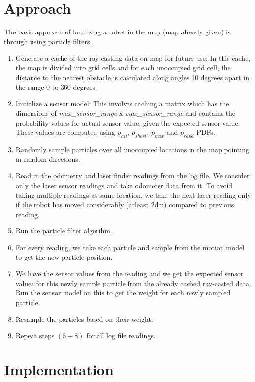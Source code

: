 \documentclass{article}
\begin{document}
\section{Approach}
The basic approach of localizing a robot in the map (map already given) is through using particle filters.
\begin{enumerate}
 \item Generate a cache of the ray-casting data on map for future use: In this cache, the map is divided into grid cells and for each unoccupied grid cell, the distance to the nearest obstacle is calculated along angles 10 degrees apart in the range 0 to 360 degrees.
 \item Initialize a sensor model: This involves caching a matrix which has the dimensions of \textit{max\_sensor\_range} x \textit{max\_sensor\_range} and contains the probability values for actual sensor value, given the expected sensor value. These values are computed using $p_{hit}$, $p_{short}$, $p_{max}$ and $p_{rand}$ PDFs.
 \item Randomly sample particles over all unoccupied locations in the map pointing in random directions.
 \item Read in the odometry and laser finder readings from the log file. We consider only the laser sensor readings and take odometer data from it. To avoid taking multiple readings at same location, we take the next laser reading only if the robot has moved considerably (atleast 2dm) compared to previous reading.
 \item Run the particle filter algorihm.
 \item For every reading, we take each particle and sample from the motion model to get the new particle position. 
 \item We have the sensor values from the reading and we get the expected sensor values for this newly sample particle from the already cached ray-casted data. Run the sensor model on this to get the weight for each newly sampled particle.
 \item Resample the particles based on their weight.
 \item Repeat steps $\left(5-8\right)$ for all log file readings.
\end{enumerate}

\section{Implementation}
\end{document}
